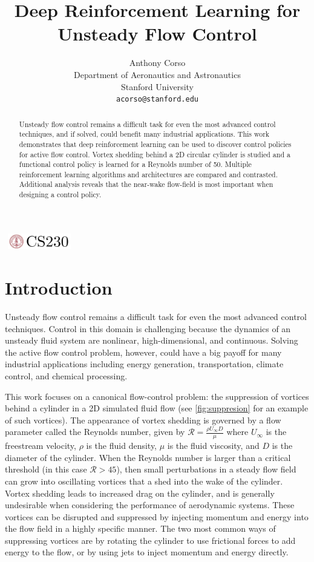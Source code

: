 \documentclass{article}
\title{\Large Deep Reinforcement Learning for Unsteady Flow Control}
\author{
  Anthony Corso \\
  Department of Aeronautics and Astronautics\\
  Stanford University\\
  \texttt{acorso@stanford.edu} \\
}
\begin{document}

\begin{center}
\includegraphics[width=3cm, height=0.7cm]{CS230}
\end{center}

\maketitle

\begin{abstract}
Unsteady flow control remains a difficult task for even the most advanced control techniques, and if solved, could benefit many industrial applications. This work demonstrates that deep reinforcement learning can be used to discover control policies for active flow control. Vortex shedding behind a 2D circular cylinder is studied and a functional control policy is learned for a Reynolds number of 50. Multiple reinforcement learning algorithms and architectures are compared and contrasted. Additional analysis reveals that the near-wake flow-field is most important when designing a control policy. 
\end{abstract}

\section{Introduction}	
Unsteady flow control remains a difficult task for even the most advanced control techniques. Control in this domain is challenging because the dynamics of an unsteady fluid system are nonlinear, high-dimensional, and continuous. Solving the active flow control problem, however, could have a big payoff for many industrial applications including energy generation, transportation, climate control, and chemical processing.

This work focuses on a canonical flow-control problem: the suppression of vortices behind a cylinder in a 2D simulated fluid flow (see \cref{fig:suppresion} for an example of such vortices). The appearance of vortex shedding is governed by a flow parameter called the Reynolds number, given by $ \mathcal{R} = \frac{\rho U_\infty D}{\mu}$ where $U_\infty$ is the freestream velocity, $\rho$ is the fluid density, $\mu$ is the fluid viscosity, and $D$ is the diameter of the cylinder. When the Reynolds number is larger than a critical threshold (in this case $\mathcal{R} > 45$), then small perturbations in a steady flow field can grow into oscillating vortices that a shed into the wake of the cylinder. Vortex shedding leads to increased drag on the cylinder, and is generally undesirable when considering the performance of aerodynamic systems. These vortices can be disrupted and suppressed by injecting momentum and energy into the flow field in a highly specific manner. The two most common ways of suppressing vortices are by rotating the cylinder to use frictional forces to add energy to the flow, or by using jets to inject momentum and energy directly.
\end{document}
